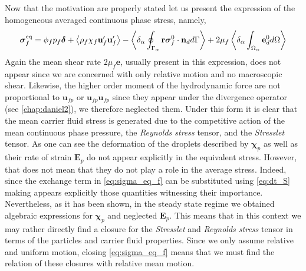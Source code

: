 Now that the motivation are properly stated let us present the expression of the homogeneous averaged continuous phase stress, namely,
\begin{equation}
    \bm{\sigma}^\text{eq}_f = 
    \phi_f p_f \bm\delta 
    +\left<\rho_f\chi_f\textbf{u}_f'\textbf{u}_f'\right>
    - \left<\delta_\alpha \oint_{\Gamma_{\alpha}} \textbf{r}\bm{\sigma}_f^0\cdot \textbf{n}_d d\Gamma\right>
    + 2 \mu_f \left<\delta_\alpha \int_{\Omega_{\alpha}} \textbf{e}_d^0 d\Omega\right>
    \label{eq:sigma_eq_f}
\end{equation} 
Again the mean shear rate $2\mu_f\textbf{e}$, usually present in this expression, does not appear since we are concerned with only relative motion and no macroscopic shear. 
Likewise, the higher order moment of the hydrodynamic force are not proportional to $\textbf{u}_{fp}$ or $\textbf{u}_{fp}\textbf{u}_{fp}$ since they appear under the divergence operator (see \ref{chap:daniel2}), we therefore neglected them. 
Under this form it is clear that the mean carrier fluid stress is generated due to the competitive action of the mean continuous phase pressure, the \textit{Reynolds stress} tensor, and the \textit{Stresslet} tensor. 
As one can see the deformation of the droplets described by $\bm\chi_p$ as well as their rate of strain $\textbf{E}_p$ do not appear explicitly in the equivalent stress. 
However, that does not mean that they do not play a role in the average stress. 
Indeed, since the exchange term in \ref{eq:sigma_eq_f} can be substituted using \ref{eq:dt_S} making appears explicitly those quantities witnessing their importance. 
Nevertheless, as it has been shown, in the steady state regime we obtained algebraic expressions for $\bm\chi_p$ and neglected $\textbf{E}_p$. 
This means that in this context we may rather directly find a closure for the \textit{Stresslet} and \textit{Reynolds stress} tensor in terms of the particles and carrier fluid properties. 
Since we only assume relative and uniform motion, closing \ref{eq:sigma_eq_f} means that we must find the relation of these closures with relative mean motion.

